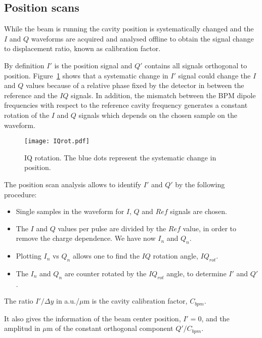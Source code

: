 \subsection{Position scans}\label{s:posscan}
While the beam is running the cavity position is systematically changed and the $I$ and $Q$ waveforms are acquired and analysed offline to obtain the signal change to displacement ratio, known as calibration factor.\par
By definition $I'$ is the position signal and $Q'$ contains all signals orthogonal to position. Figure~\ref{f:IQrot} shows that a systematic change in $I'$ signal could change the $I$ and $Q$ values because of a relative phase fixed by the detector in between the reference and the $IQ$ signals. In addition, the mismatch between the BPM dipole frequencies with respect to the reference cavity frequency generates a constant rotation of the $I$ and $Q$ signals which depends on the chosen sample on the waveform.\par
\begin{figure}[htb]
 \centering%
 \texttt{[image: IQrot.pdf]}\caption{IQ rotation. The blue dots represent the systematic change in position.}\label{f:IQrot}
\end{figure}
The position scan analysis allows to identify $I'$ and $Q'$ by the following procedure:
\begin{itemize}
 \item Single samples in the waveform for $I$, $Q$ and $Ref$ signals are chosen.\par
 \item The $I$ and $Q$ values per pulse are divided by the $Ref$ value, in order to remove the charge dependence. We have now $I_n$ and $Q_n$.\par
 \item Plotting $I_n$ vs $Q_n$ allows one to find the $IQ$ rotation angle, $IQ_{rot}$.\par
 \item The $I_n$ and $Q_n$ are counter rotated by the $IQ_{rot}$ angle, to determine $I'$ and $Q'$.
\end{itemize}
The ratio $I'/\Delta y$ in a.u./$\mu$m is the cavity calibration factor, $C_{bpm}$.\par
It also gives the information of the beam center position, $I'=0$, and the amplitud in $\mu$m of the constant orthogonal component $Q'/C_{bpm}$.\par
